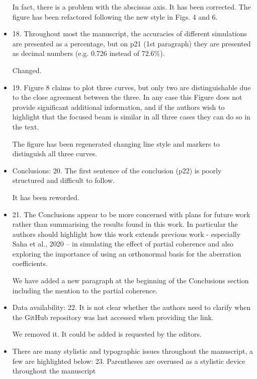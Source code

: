 \documentclass[11pt]{letter} %
\newcommand{\inred}[1]{{\color{red}#1}}
\begin{document}
\begin{letter}{}
\begin{itemize}
    \inred{In fact, there is a problem with the abscissas axis. It has been corrected. The figure has been refactored following the new style in Figs. 4 and 6. }
    
    \item 18. Throughout most the manuscript, the accuracies of different simulations are presented as a percentage, but on p21 (1st paragraph) they are presented as decimal numbers (e.g. 0.726 instead of 72.6\%).
    
    \inred{Changed.}
    
    \item 19. Figure 8 claims to plot three curves, but only two are distinguishable due to the close agreement between the three. In any case this Figure does not provide significant additional information, and if the authors wish to highlight that the focused beam is similar in all three cases they can do so in the text.
    
    \inred{The figure has been regenerated changing line style and markers to distinguish all three curves.}
    
    \item Conclusions: 20. The first sentence of the conclusion (p22) is poorly structured and difficult to follow.
    
    \inred{It has been reworded.}
    
    \item 21. The Conclusions appear to be more concerned with plans for future work rather than summarising the results found in this work. In particular the authors should highlight how this work extends previous work - especially Saha et al., 2020 – in simulating the effect of partial coherence and also exploring the importance of using an orthonormal basis for the aberration coefficients.
    
    \inred{We have added a new paragraph at the beginning of the Conclusions section including the mention to the partial coherence.}
    
    \item Data availability: 22. It is not clear whether the authors need to clarify when the GitHub repository was last accessed when providing the link. 
    
    \inred{We removed it. It could be added is requested by the editors. }
    
    \item There are many stylistic and typographic issues throughout the manuscript, a few are highlighted below: 23. Parentheses are overused as a stylistic device throughout the manuscript
    

\end{itemize}
\end{letter}
\end{document}
